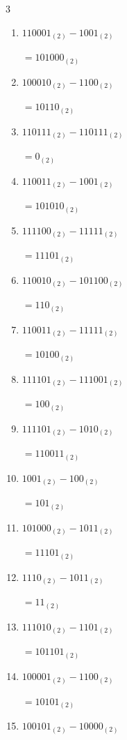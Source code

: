 \begin{multicols}{3}
\begin{enumerate}
  \item $110001_{(2)} - 1001_{(2)}$

        $=101000_{(2)}$

  \item $100010_{(2)} - 1100_{(2)}$

        $=10110_{(2)}$

  \item $110111_{(2)} - 110111_{(2)}$

        $=0_{(2)}$

  \item $110011_{(2)} - 1001_{(2)}$

        $=101010_{(2)}$

  \item $111100_{(2)} - 11111_{(2)}$

        $=11101_{(2)}$

\columnbreak %

  \item $110010_{(2)} - 101100_{(2)}$

        $=110_{(2)}$

  \item $110011_{(2)} - 11111_{(2)}$

        $=10100_{(2)}$

  \item $111101_{(2)} - 111001_{(2)}$

        $=100_{(2)}$

  \item $111101_{(2)} - 1010_{(2)}$

        $=110011_{(2)}$

  \item $1001_{(2)} - 100_{(2)}$

        $=101_{(2)}$

  \item $101000_{(2)} - 1011_{(2)}$

        $=11101_{(2)}$

  \item $1110_{(2)} - 1011_{(2)}$

        $=11_{(2)}$

  \item $111010_{(2)} - 1101_{(2)}$

        $=101101_{(2)}$

  \item $100001_{(2)} - 1100_{(2)}$

        $=10101_{(2)}$

  \item $100101_{(2)} - 10000_{(2)}$


\end{enumerate}
\end{multicols}
